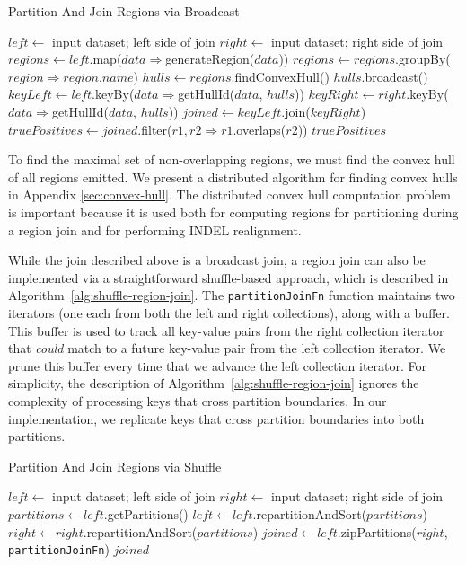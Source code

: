 \documentclass[phd]{ucbthesis}
\begin{document}
\begin{algorithm}
\caption{Partition And Join Regions via Broadcast}
\label{alg:region-join}
\begin{algorithmic}
\STATE $left \leftarrow$ input dataset; left side of join
\STATE $right \leftarrow$ input dataset; right side of join
\STATE $regions \leftarrow left$.map($data \Rightarrow $generateRegion($data$))
\STATE $regions \leftarrow regions$.groupBy($region \Rightarrow region$.$name$)
\STATE $hulls \leftarrow regions$.findConvexHull()
\STATE $hulls$.broadcast()
\STATE $keyLeft \leftarrow left$.keyBy($data \Rightarrow $getHullId($data$, $hulls$))
\STATE $keyRight \leftarrow right$.keyBy($data \Rightarrow $getHullId($data$, $hulls$))
\STATE $joined \leftarrow keyLeft$.join($keyRight$)
\STATE $truePositives \leftarrow joined$.filter($r1, r2 \Rightarrow r1$.overlaps($r2$))
\RETURN $truePositives$
\end{algorithmic}
\end{algorithm}

To find the maximal set of non-overlapping regions, we must find the convex hull of all regions emitted.
We present a distributed algorithm for finding convex hulls in Appendix \ref{sec:convex-hull}. The
distributed convex hull computation problem is important because it is used both for computing regions
for partitioning during a region join and for performing INDEL realignment.

While the join described above is a broadcast join, a region join can also be implemented via a straightforward
shuffle-based approach, which is described in Algorithm~\ref{alg:shuffle-region-join}. The \texttt{partitionJoinFn}
function maintains two iterators (one each from both the left and right collections), along with a buffer. This buffer is
used to track all key-value pairs from the right collection iterator that \emph{could} match to a future key-value pair
from the left collection iterator. We prune this buffer every time that we advance the left collection iterator. For
simplicity, the description of Algorithm~\ref{alg:shuffle-region-join} ignores the complexity of processing keys that cross
partition boundaries. In our implementation, we replicate keys that cross partition boundaries into both partitions.

\begin{algorithm}
\caption{Partition And Join Regions via Shuffle}
\label{alg:shuffle-region-join}
\begin{algorithmic}
\STATE $left \leftarrow$ input dataset; left side of join
\STATE $right \leftarrow$ input dataset; right side of join
\STATE $partitions \leftarrow left$.getPartitions()
\STATE $left \leftarrow left$.repartitionAndSort($partitions$)
\STATE $right \leftarrow right$.repartitionAndSort($partitions$)
\STATE $joined \leftarrow left$.zipPartitions($right$, \texttt{partitionJoinFn})
\RETURN $joined$
\end{algorithmic}
\end{algorithm}
\end{document}
